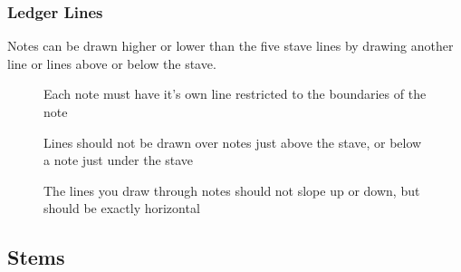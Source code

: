 \subsubsection*{Ledger Lines}

Notes can be drawn higher or lower than the five stave lines by drawing another line or lines above or below the stave.

\begin{figure}[h!]
  \centering
  \caption{Each note must have it's own line restricted to the boundaries of the note}
  \label{fig:LedgerBoundaries}
\end{figure}


\begin{figure}[h!]
  \centering
  \caption{Lines should not be drawn over notes just above the stave, or below a note just under the stave}
  \label{fig:LedgerAbove}
\end{figure}


\begin{figure}[h!]
  \centering
  \caption{The lines you draw through notes should not slope up or down, but should be exactly horizontal}
  \label{fig:LedgerSlope}
\end{figure}

\subsection*{Stems}

